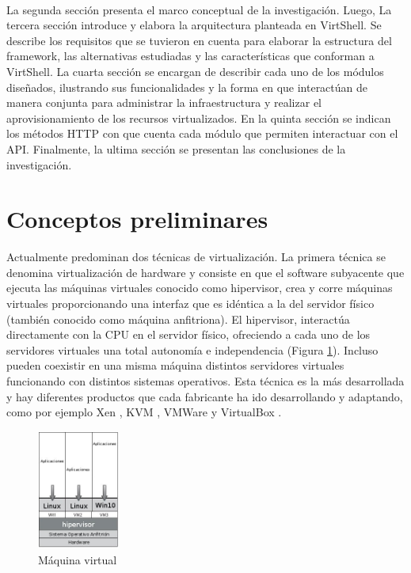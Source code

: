 \documentclass[conference, spanish]{IEEEtran}
\begin{document}
\\
La segunda sección presenta el marco conceptual de la investigación. Luego, La tercera sección introduce y elabora la arquitectura planteada en VirtShell. Se describe los requisitos que se tuvieron en cuenta para elaborar la estructura del framework, las alternativas estudiadas y las características que conforman a VirtShell. La cuarta sección se encargan de describir cada uno de los módulos diseñados, ilustrando sus funcionalidades y la forma en que interactúan de manera conjunta para administrar la infraestructura y realizar el aprovisionamiento de los recursos virtualizados. En la quinta sección se indican los métodos HTTP con que cuenta cada módulo que permiten interactuar con el API. Finalmente, la ultima sección se presentan las conclusiones de la investigación.

\section{Conceptos preliminares}
Actualmente predominan dos técnicas de virtualización. La primera técnica se denomina virtualización de hardware y consiste en que el software subyacente que ejecuta las máquinas virtuales conocido como hipervisor, crea y corre máquinas virtuales proporcionando una interfaz que es idéntica a la del servidor físico (también conocido como máquina anfitriona). El hipervisor, interactúa directamente con la CPU en el servidor físico, ofreciendo a cada uno de los servidores virtuales una total autonomía e independencia (Figura \ref{fig:hipervisor}). Incluso pueden coexistir en una misma máquina distintos servidores virtuales funcionando con distintos sistemas operativos. Esta técnica es la más desarrollada y hay diferentes productos que cada fabricante ha ido desarrollando y adaptando, como por ejemplo Xen \cite{xen16}, KVM \cite{kvm16}, VMWare \cite{vmware16} y VirtualBox \cite{virtualbox16}.\\

\begin{figure}[h]
  \centering
  \includegraphics[width = 0.24\textwidth]{../architecture/v1/diagrams/virtualmachine}
  \caption{Máquina virtual}
  \label{fig:hipervisor}
\end{figure}
\end{document}
